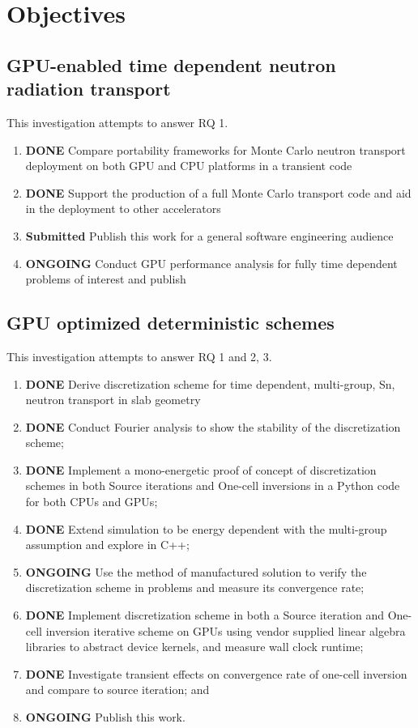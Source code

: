 \chapter{Objectives}
\label{ch:objectives}

\section{GPU-enabled time dependent neutron radiation transport}
This investigation attempts to answer RQ 1.
\begin{enumerate}
    \item \textbf{DONE} Compare portability frameworks for Monte Carlo neutron transport deployment on both GPU and CPU platforms in a transient code
    \item \textbf{DONE} Support the production of a full Monte Carlo transport code and aid in the deployment to other accelerators
    \item \textbf{Submitted} Publish this work for a general software engineering audience
    \item \textbf{ONGOING} Conduct GPU performance analysis for fully time dependent problems of interest and publish
\end{enumerate}


\section{GPU optimized deterministic schemes}
This investigation attempts to answer RQ 1 and 2, 3.
\begin{enumerate}
    \item \textbf{DONE} Derive discretization scheme for time dependent, multi-group, Sn, neutron transport in slab geometry
    \item \textbf{DONE} Conduct Fourier analysis to show the stability of the discretization scheme;
    \item \textbf{DONE} Implement a mono-energetic proof of concept of discretization schemes in both Source iterations and One-cell inversions in a Python code for both CPUs and GPUs;
    \item \textbf{DONE} Extend simulation to be energy dependent with the multi-group assumption and explore in C++;
    \item \textbf{ONGOING} Use the method of manufactured solution to verify the discretization scheme in problems and measure its convergence rate;
    \item \textbf{DONE} Implement discretization scheme in both a Source iteration and One-cell inversion iterative scheme on GPUs using vendor supplied linear algebra libraries to abstract device kernels, and measure wall clock runtime; 
    \item \textbf{DONE} Investigate transient effects on convergence rate of one-cell inversion and compare to source iteration; and
    \item \textbf{ONGOING} Publish this work.
\end{enumerate}

